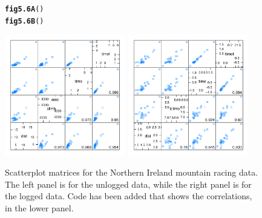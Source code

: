 \documentclass[12pt, a4paper,  BCOR=8.25mm, DIV=15]{scrartcl}\usepackage[]{graphicx}\usepackage[]{color}
\makeatletter
\newcommand{\hlstd}[1]{\textcolor[rgb]{0.345,0.345,0.345}{#1}}%
\newcommand{\hlkwd}[1]{\textcolor[rgb]{0.737,0.353,0.396}{\textbf{#1}}}%
\newenvironment{kframe}{%
 \def\at@end@of@kframe{}%
 \ifinner\ifhmode%
  \def\at@end@of@kframe{\end{minipage}}%
  \begin{minipage}{\columnwidth}%
 \fi\fi%
 \def\FrameCommand##1{\hskip\@totalleftmargin \hskip-\fboxsep
 \colorbox{shadecolor}{##1}\hskip-\fboxsep
     \hskip-\linewidth \hskip-\@totalleftmargin \hskip\columnwidth}%
 \MakeFramed {\advance\hsize-\width
   \@totalleftmargin\z@ \linewidth\hsize
   \@setminipage}}%
 {\par\unskip\endMakeFramed%
 \at@end@of@kframe}
\newenvironment{knitrout}{}{} %
\makeatother
\begin{document}
\begin{figure}
\vspace*{-6pt}
\begin{knitrout}
\color{fgcolor}\begin{kframe}
\begin{alltt}
\hlkwd{fig5.6A}\hlstd{()}
\hlkwd{fig5.6B}\hlstd{()}
\end{alltt}
\end{kframe}

{\centering \includegraphics[width=0.47\textwidth]{figs/glm-fig5_6e-1} 
\includegraphics[width=0.47\textwidth]{figs/glm-fig5_6e-2} 

}



\end{knitrout}
\caption{Scatterplot matrices for the Northern Ireland mountain racing
  data. The left panel is for the unlogged data, while the right panel is
for the logged data.  Code has been added that shows the correlations,
in the lower panel.\label{fig:nimra}}
\end{figure}
\end{document}
